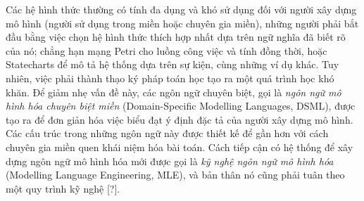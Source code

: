 Các hệ hình thức thường có tính đa dụng và khó sử dụng đối với người xây dựng mô hình (người sử dụng trong miền hoặc chuyên gia miền), những người phải bắt đầu bằng việc chọn hệ hình thức thích hợp nhất dựa trên ngữ nghĩa đã biết rõ của nó; chẳng hạn mạng Petri cho luồng công việc và tính đồng thời, hoặc Statecharts để mô tả hệ thống dựa trên sự kiện, cùng những ví dụ khác. Tuy nhiên, việc phải thành thạo ký pháp toán học tạo ra một quá trình học khó khăn. Để giảm nhẹ vấn đề này, các ngôn ngữ chuyên biệt, gọi là \emph{ngôn ngữ mô hình hóa chuyên biệt miền} (Domain-Specific Modelling Languages, DSML), được tạo ra để đơn giản hóa việc biểu đạt ý định đặc tả của người xây dựng mô hình. Các cấu trúc trong những ngôn ngữ này được thiết kế để gần hơn với cách chuyên gia miền quen khái niệm hóa bài toán. Cách tiếp cận có hệ thống để xây dựng ngôn ngữ mô hình hóa mới được gọi là \emph{kỹ nghệ ngôn ngữ mô hình hóa} (Modelling Language Engineering, MLE), và bản thân nó cũng phải tuân theo một quy trình kỹ nghệ [?].

